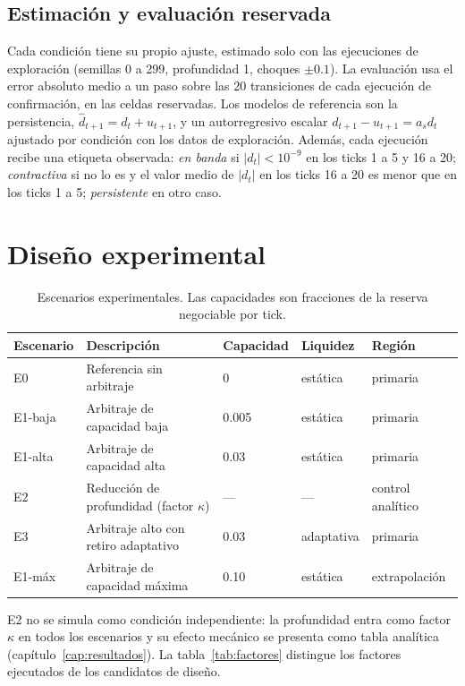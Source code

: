 \subsection{Estimación y evaluación reservada}

Cada condición tiene su propio ajuste, estimado solo con las ejecuciones de exploración (semillas 0 a 299, profundidad 1, choques $\pm0.1$). La evaluación usa el error absoluto medio a un paso sobre las 20 transiciones de cada ejecución de confirmación, en las celdas reservadas. Los modelos de referencia son la persistencia, $\hat d_{t+1}=d_t+u_{t+1}$, y un autorregresivo escalar $d_{t+1}-u_{t+1}=a_s d_t$ ajustado por condición con los datos de exploración. Además, cada ejecución recibe una etiqueta observada: \emph{en banda} si $|d_t|<10^{-9}$ en los ticks 1 a 5 y 16 a 20; \emph{contractiva} si no lo es y el valor medio de $|d_t|$ en los ticks 16 a 20 es menor que en los ticks 1 a 5; \emph{persistente} en otro caso.

\section{Diseño experimental}

\begin{table}[htbp]
\centering
\caption{Escenarios experimentales. Las capacidades son fracciones de la reserva negociable por tick.}
\label{tab:escenarios}
\small
\begin{tabularx}{\textwidth}{@{}l >{\raggedright\arraybackslash}X l l l@{}}
\toprule
Escenario & Descripción & Capacidad & Liquidez & Región \\
\midrule
E0 & Referencia sin arbitraje & 0 & estática & primaria \\
E1-baja & Arbitraje de capacidad baja & 0.005 & estática & primaria \\
E1-alta & Arbitraje de capacidad alta & 0.03 & estática & primaria \\
E2 & Reducción de profundidad (factor $\kappa$) & --- & --- & control analítico \\
E3 & Arbitraje alto con retiro adaptativo & 0.03 & adaptativa & primaria \\
E1-máx & Arbitraje de capacidad máxima & 0.10 & estática & extrapolación \\
\bottomrule
\end{tabularx}
\end{table}

E2 no se simula como condición independiente: la profundidad entra como factor $\kappa$ en todos los escenarios y su efecto mecánico se presenta como tabla analítica (capítulo~\ref{cap:resultados}). La tabla~\ref{tab:factores} distingue los factores ejecutados de los candidatos de diseño.

